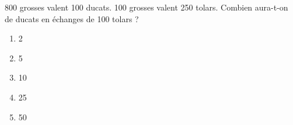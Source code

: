 800 grosses valent 100 ducats. 100 grosses valent 250 tolars. Combien aura-t-on de ducats en échanges de 100 tolars ?
\begin{multicols}{5}
  \begin{enumerate}[A/]
  \item 2
  \item 5
  \item 10
  \item 25
  \item 50
  \end{enumerate}
\end{multicols}